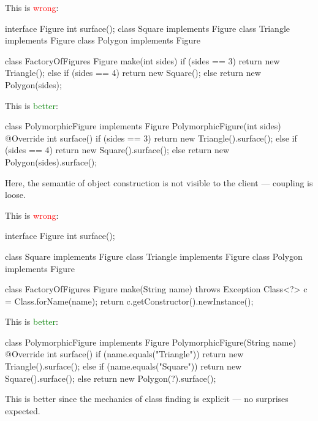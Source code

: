 \documentclass{article}
\begin{document}
\begin{pptWide}{2}
This is \textcolor{red}{wrong}:
\par
{\scriptsize\begin{ffcode}
interface Figure
  int surface();
class Square implements Figure
class Triangle implements Figure
class Polygon implements Figure

class FactoryOfFigures
  Figure make(int sides) {
    if (sides == 3) {
      return new Triangle();
    } else if (sides == 4) {
      return new Square();
    } else {
      return new Polygon(sides);
    }
  }
\end{ffcode}
}
\par\columnbreak\par
This is \textcolor{green}{better}:
\par
{\scriptsize\begin{ffcode}
class PolymorphicFigure implements Figure
  PolymorphicFigure(int sides)
  @Override int surface() {
    if (sides == 3) {
      return new Triangle().surface();
    } else if (sides == 4) {
      return new Square().surface();
    } else {
      return new Polygon(sides).surface();
    }
  }
\end{ffcode}
}
\par
Here, the semantic of object construction is not visible to the client --- coupling is loose.
\end{pptWide}
\plush{}

\begin{pptWide}{2}
This is \textcolor{red}{wrong}:
\par
{\scriptsize\begin{ffcode}
interface Figure
  int surface();

class Square implements Figure
class Triangle implements Figure
class Polygon implements Figure

class FactoryOfFigures
  Figure make(String name) throws Exception {
    Class<?> c = Class.forName(name);
    return c.getConstructor().newInstance();
  }
\end{ffcode}
}
\par\columnbreak\par
This is \textcolor{green}{better}:
\par
{\scriptsize\begin{ffcode}
class PolymorphicFigure implements Figure
  PolymorphicFigure(String name)
  @Override int surface() {
    if (name.equals("Triangle")) {
      return new Triangle().surface();
    } else if (name.equals("Square")) {
      return new Square().surface();
    } else {
      return new Polygon(?).surface();
    }
  }
\end{ffcode}
}
\par
This is better since the mechanics of class finding is explicit --- no surprises expected.
\end{pptWide}
\plush{}
\end{document}
